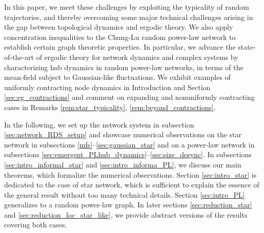 \documentclass[a4paper]{article}
\theoremstyle{plain}
\theoremstyle{definition}
\begin{document}

In this paper, we meet these challenges by exploiting the typicality of random trajectories, and thereby overcoming some major technical challenges arising in the gap between topological dynamics and ergodic theory. We also apply concentration inequalities to the Chung-Lu random power-law network to establish certain graph theoretic properties.  
In particular, we advance the state-of-the-art of ergodic theory for network dynamics and complex systems by  characterizing hub dynamics in random power-law networks, in terms of the mean-field subject to Gaussian-like fluctuations.
We exhibit examples of uniformly contracting node dynamics in Introduction and Section \ref{sec:eg_contractions} and comment on  expanding and nonuniformly contracting cases in Remarks \ref{rem:star_typicality}, \ref{rem:beyond_contractions}.




In the following, we set up the network system in subsection \ref{sec:network_RDS_setup} and showcase numerical observations on the star network in subsections \ref{mfs}--\ref{sec:gaussian_star} and on a power-law network in subsections \ref{sec:emergent_PLhub_dynamics}--\ref{sec:size_desync}. In subsections \ref{sec:intro_informal_star} and \ref{sec:intro_informa_PL}, we  discuss our main theorems, which formalize the numerical observations. Section \ref{sec:intro_star} is dedicated to the case of star network, which is sufficient to explain the essence of the general result without too many technical details. Section \ref{sec:intro_PL} generalizes to a random power-law graph. In later sections \ref{sec:reduction_star} and \ref{sec:reduction_loc_star_like}, we provide abstract versions of the results covering both cases. 
\end{document}
